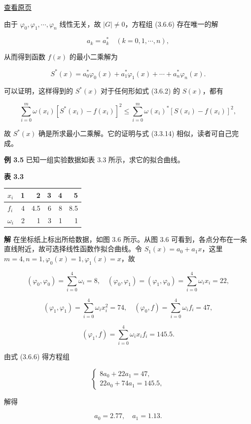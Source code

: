 \documentclass[
  10pt,
  fontset=fandol]{ctexart}
\newcounter{none} %
\begin{document}
\href{../../source-images/pdf-080.jpeg}{查看原页}

由于 \(\varphi_0,\varphi_1,\cdots,\varphi_n\) 线性无关，故 \(|G|\ne0\)，方程组 (3.6.6) 存在唯一的解

\[
a_k=a_k^*\quad(k=0,1,\cdots,n),
\]

从而得到函数 \(f(x)\) 的最小二乘解为

\[
S^*(x)=a_0^*\varphi_0(x)+a_1^*\varphi_1(x)+\cdots+a_n^*\varphi_n(x).
\]

可以证明，这样得到的 \(S^*(x)\) 对于任何形如式 (3.6.2) 的 \(S(x)\)，都有

\[
\sum_{i=0}^m\omega(x_i)[S^*(x_i)-f(x_i)]^2\leqslant\sum_{i=0}^m\omega(x_i)^*[S(x_i)-f(x_i)]^2,
\]

故 \(S^*(x)\) 确是所求最小二乘解。它的证明与式 (3.3.14) 相似，读者可自己完成。

\textbf{例 3.5} 已知一组实验数据如表 3.3 所示，求它的拟合曲线。

\textbf{表 3.3}

{\def\LTcaptype{none} %
\begin{longtable}[]{@{}lrrrrr@{}}
\toprule\noalign{}
\(x_i\) & 1 & 2 & 3 & 4 & 5 \\
\midrule\noalign{}
\endhead
\bottomrule\noalign{}
\endlastfoot
\(f_i\) & 4 & 4.5 & 6 & 8 & 8.5 \\
\(\omega_i\) & 2 & 1 & 3 & 1 & 1 \\
\end{longtable}
}

\textbf{解} 在坐标纸上标出所给数据，如图 3.6 所示。从图 3.6 可看到，各点分布在一条直线附近，故可选择线性函数作拟合曲线。令 \(S_1(x)=a_0+a_1x\)，这里 \(m=4,n=1,\varphi_0(x)=1,\varphi_1(x)=x\)，故

\[
(\varphi_0,\varphi_0)=\sum_{i=0}^4\omega_i=8,\quad(\varphi_0,\varphi_1)=(\varphi_1,\varphi_0)=\sum_{i=0}^4\omega_ix_i=22,
\]

\[
(\varphi_1,\varphi_1)=\sum_{i=0}^4\omega_ix_i^2=74,\quad(\varphi_0,f)=\sum_{i=0}^4\omega_if_i=47,
\]

\[
(\varphi_1,f)=\sum_{i=0}^4\omega_ix_if_i=145.5.
\]

由式 (3.6.6) 得方程组

\[
\begin{cases}
8a_0+22a_1=47,\\
22a_0+74a_1=145.5,
\end{cases}
\]

解得

\[
a_0=2.77,\quad a_1=1.13.
\]
\end{document}
